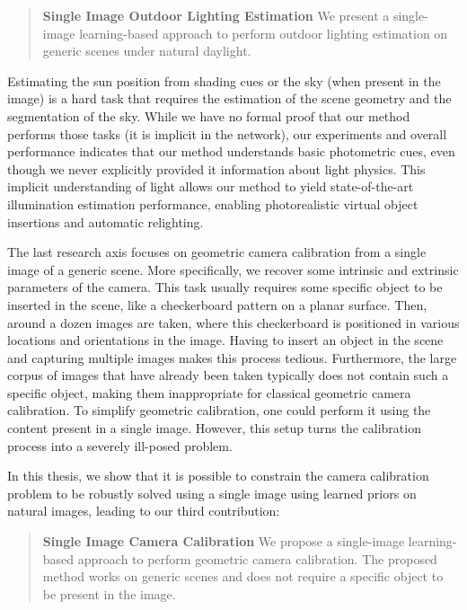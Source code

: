 \begin{quotation}
\textbf{Single Image Outdoor Lighting Estimation} We present a single-image learning-based approach to perform outdoor lighting estimation on generic scenes under natural daylight. 
\end{quotation}

Estimating the sun position from shading cues or the sky (when present in the image) is a hard task that requires the estimation of the scene geometry and the segmentation of the sky. While we have no formal proof that our method performs those tasks (it is implicit in the network), our experiments and overall performance indicates that our method understands basic photometric cues, even though we never explicitly provided it information about light physics. This implicit understanding of light allows our method to yield state-of-the-art illumination estimation performance, enabling photorealistic virtual object insertions and automatic relighting. 

The last research axis focuses on geometric camera calibration from a single image of a generic scene. More specifically, we recover some intrinsic and extrinsic parameters of the camera. This task usually requires some specific object to be inserted in the scene, like a checkerboard pattern on a planar surface. Then, around a dozen images are taken, where this checkerboard is positioned in various locations and orientations in the image. Having to insert an object in the scene and capturing multiple images makes this process tedious. Furthermore, the large corpus of images that have already been taken typically does not contain such a specific object, making them inappropriate for classical geometric camera calibration. To simplify geometric calibration, one could perform it using the content present in a single image. However, this setup turns the calibration process into a severely ill-posed problem. 

In this thesis, we show that it is possible to constrain the camera calibration problem to be robustly solved using a single image using learned priors on natural images, leading to our third contribution: 

\begin{quotation}
\textbf{Single Image Camera Calibration} We propose a single-image learning-based approach to perform geometric camera calibration. The proposed method works on generic scenes and does not require a specific object to be present in the image. 
\end{quotation}

